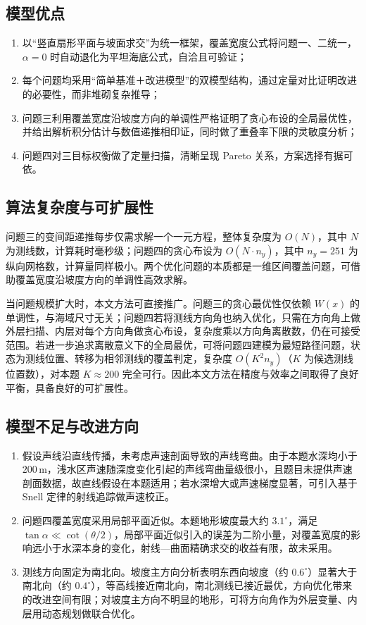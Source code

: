 \documentclass[12pt]{ctexart}
\begin{document}
\subsection{模型优点}
\begin{enumerate}[label=(\arabic*)]
\item 以``竖直扇形平面与坡面求交''为统一框架，覆盖宽度公式将问题一、二统一，$\alpha=0$ 时自动退化为平坦海底公式，自洽且可验证；
\item 每个问题均采用``简单基准＋改进模型''的双模型结构，通过定量对比证明改进的必要性，而非堆砌复杂推导；
\item 问题三利用覆盖宽度沿坡度方向的单调性严格证明了贪心布设的全局最优性，并给出解析积分估计与数值递推相印证，同时做了重叠率下限的灵敏度分析；
\item 问题四对三目标权衡做了定量扫描，清晰呈现 Pareto 关系，方案选择有据可依。
\end{enumerate}

\subsection{算法复杂度与可扩展性}

问题三的变间距递推每步仅需求解一个一元方程，整体复杂度为 $O(N)$，其中 $N$ 为测线数，计算耗时毫秒级；问题四的贪心布设为 $O(N\cdot n_y)$，其中 $n_y=251$ 为纵向网格数，计算量同样极小。两个优化问题的本质都是一维区间覆盖问题，可借助覆盖宽度沿坡度方向的单调性高效求解。

当问题规模扩大时，本文方法可直接推广。问题三的贪心最优性仅依赖 $W(x)$ 的单调性，与海域尺寸无关；问题四若将测线方向角也纳入优化，只需在方向角上做外层扫描、内层对每个方向角做贪心布设，复杂度乘以方向角离散数，仍在可接受范围。若进一步追求离散意义下的全局最优，可将问题四建模为最短路径问题，状态为测线位置、转移为相邻测线的覆盖判定，复杂度 $O(K^2n_y)$（$K$ 为候选测线位置数），对本题 $K\approx200$ 完全可行。因此本文方法在精度与效率之间取得了良好平衡，具备良好的可扩展性。

\subsection{模型不足与改进方向}
\begin{enumerate}[label=(\arabic*)]
\item 假设声线沿直线传播，未考虑声速剖面导致的声线弯曲。由于本题水深均小于 $200\,\mathrm{m}$，浅水区声速随深度变化引起的声线弯曲量级很小，且题目未提供声速剖面数据，故直线假设在本题适用；若水深增大或声速梯度显著，可引入基于 Snell 定律的射线追踪做声速校正。
\item 问题四覆盖宽度采用局部平面近似。本题地形坡度最大约 $3.1^\circ$，满足 $\tan\alpha\ll\cot(\theta/2)$，局部平面近似引入的误差为二阶小量，对覆盖宽度的影响远小于水深本身的变化，射线—曲面精确求交的收益有限，故未采用。
\item 测线方向固定为南北向。坡度主方向分析表明东西向坡度（约 $0.6^\circ$）显著大于南北向（约 $0.4^\circ$），等高线接近南北向，南北测线已接近最优，方向优化带来的改进空间有限；对坡度主方向不明显的地形，可将方向角作为外层变量、内层用动态规划做联合优化。
\end{enumerate}
\end{document}
